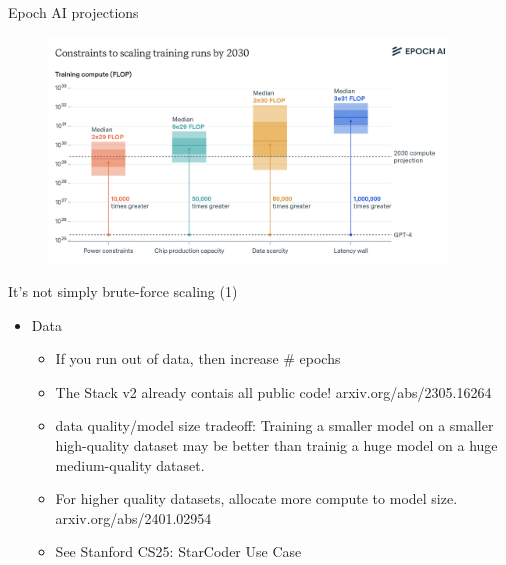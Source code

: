 \begin{vbframe}{Epoch AI projections}

\vfill

\begin{figure}
	\centering
	\includegraphics[height = 6cm]{./figure/epochai.png} 
\end{figure}



\vfill

\end{vbframe}


\begin{vbframe}{It's not simply brute-force scaling (1)}

\vfill

\begin{itemize}
	\item Data
	\begin{itemize}
	\item If you run out of data, then increase \# epochs
        \item The Stack v2
	already contais all public code! arxiv.org/abs/2305.16264
        \item data quality/model size tradeoff: Training
	a smaller model on  a smaller high-quality dataset may be
	better than trainig a huge model on a huge
	medium-quality dataset.
        \item For higher quality datasets, allocate more
	compute to model size. arxiv.org/abs/2401.02954
        \item See Stanford CS25: StarCoder Use Case
	\end{itemize}

\end{itemize}

\vfill

\end{vbframe}



